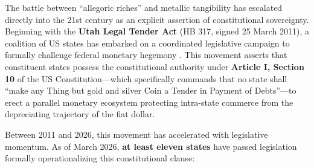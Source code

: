\documentclass[
]{article}
\begin{document}
The battle between ``allegoric riches'' and metallic tangibility has
escalated directly into the 21st century as an explicit assertion of
constitutional sovereignty. Beginning with the \textbf{Utah Legal Tender
Act} (HB 317, signed 25 March 2011), a coalition of US states has
embarked on a coordinated legislative campaign to formally challenge
federal monetary hegemony
\citep{utah2011legal, greene2015understanding}. This movement asserts
that constituent states possess the constitutional authority under
\textbf{Article I, Section 10} of the US Constitution---which
specifically commands that no state shall ``make any Thing but gold and
silver Coin a Tender in Payment of Debts''---to erect a parallel
monetary ecosystem protecting intra-state commerce from the depreciating
trajectory of the fiat dollar.

Between 2011 and 2026, this movement has accelerated with legislative
momentum. As of March 2026, \textbf{at least eleven states} have passed
legislation formally operationalizing this constitutional clause:
\end{document}
